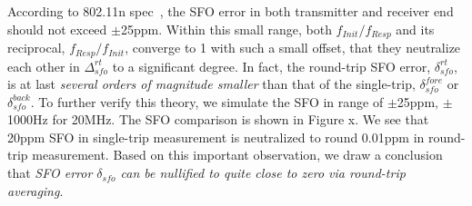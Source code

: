 According to 802.11n spec~\cite[Chapter 20.3.21.6]{80211n_spec}, 
the SFO error in both transmitter and receiver end should not exceed $\pm$25ppm.
Within this small range, 
both $f_{Init}/f_{Resp}$ and its reciprocal, $f_{Resp}/f_{Init}$, 
converge to 1 with such a small offset, 
that they neutralize each other in $\Delta_{sfo}^{rt}$ to a significant degree.
In fact,
the round-trip SFO error, $\delta_{sfo}^{rt}$, is at last \textit{several orders of magnitude smaller} 
than that of the single-trip, $\delta_{sfo}^{fore}$ or $\delta_{sfo}^{back}$.
%
To further verify this theory,
we simulate the SFO in range of $\pm$25ppm, \ie $\pm$1000Hz for 20MHz.
The SFO comparison is shown in Figure x.
We see that 20ppm SFO in single-trip measurement is neutralized to round 0.01ppm in round-trip measurement.
Based on this important observation, we draw a conclusion that
\textit{SFO error $\delta_{sfo}$ can be nullified to quite close to zero via round-trip averaging}.












